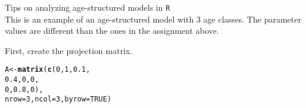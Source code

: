 \documentclass[12pt]{article}\usepackage[]{graphicx}\usepackage[]{color}
\makeatletter
\newcommand{\hlnum}[1]{\textcolor[rgb]{0.686,0.059,0.569}{#1}}%
\newcommand{\hlstd}[1]{\textcolor[rgb]{0.345,0.345,0.345}{#1}}%
\newcommand{\hlkwb}[1]{\textcolor[rgb]{0.69,0.353,0.396}{#1}}%
\newcommand{\hlkwc}[1]{\textcolor[rgb]{0.333,0.667,0.333}{#1}}%
\newcommand{\hlkwd}[1]{\textcolor[rgb]{0.737,0.353,0.396}{\textbf{#1}}}%
\newenvironment{kframe}{%
 \def\at@end@of@kframe{}%
 \ifinner\ifhmode%
  \def\at@end@of@kframe{\end{minipage}}%
  \begin{minipage}{\columnwidth}%
 \fi\fi%
 \def\FrameCommand##1{\hskip\@totalleftmargin \hskip-\fboxsep
 \colorbox{shadecolor}{##1}\hskip-\fboxsep
     \hskip-\linewidth \hskip-\@totalleftmargin \hskip\columnwidth}%
 \MakeFramed {\advance\hsize-\width
   \@totalleftmargin\z@ \linewidth\hsize
   \@setminipage}}%
 {\par\unskip\endMakeFramed%
 \at@end@of@kframe}
\newenvironment{knitrout}{}{} %
\makeatother
\begin{document}
Tips on analyzing age-structured models in {\tt R} \\

This is an example of an age-structured model with 3 age classes. The
parameter values are different than the ones in the assignment above.

First, create the projection matrix.
\begin{knitrout}
\color{fgcolor}\begin{kframe}
\begin{alltt}
\hlstd{A} \hlkwb{<-} \hlkwd{matrix}\hlstd{(}\hlkwd{c}\hlstd{(}\hlnum{0}  \hlstd{,} \hlnum{1}\hlstd{,} \hlnum{0.1}\hlstd{,}
              \hlnum{0.4}\hlstd{,} \hlnum{0}\hlstd{,} \hlnum{0}\hlstd{,}
              \hlnum{0}  \hlstd{,} \hlnum{0.8}\hlstd{,} \hlnum{0}\hlstd{),}
            \hlkwc{nrow}\hlstd{=}\hlnum{3}\hlstd{,} \hlkwc{ncol}\hlstd{=}\hlnum{3}\hlstd{,} \hlkwc{byrow}\hlstd{=}\hlnum{TRUE}\hlstd{)}
\end{alltt}
\end{kframe}
\end{knitrout}
\end{document}
